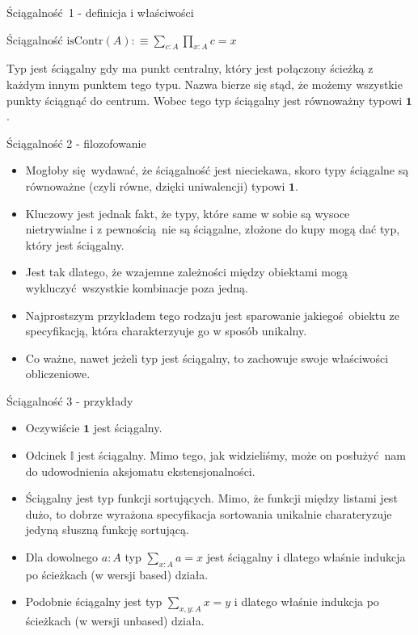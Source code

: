\documentclass{beamer}
\newcommand{\defn}{:\equiv}
\newcommand{\isContr}{\text{isContr}}
\newcommand{\I}{\mathbb{I}}
\begin{document}
\begin{frame}{Ściągalność 1 - definicja i właściwości}

\begin{block}{Ściągalność}
$
\displaystyle
\isContr(A) \defn \sum_{c : A} \prod_{x : A} c = x
$
\end{block}

Typ jest ściągalny gdy ma punkt centralny, który jest połączony ścieżką z każdym innym punktem tego typu. Nazwa bierze się stąd, że możemy wszystkie punkty ściągnąć do centrum. Wobec tego typ ściągalny jest równoważny typowi $\textbf{1}$.

\end{frame}

\begin{frame}{Ściągalność 2 - filozofowanie}
\begin{itemize}
	\item Mogłoby się wydawać, że ściągalność jest nieciekawa, skoro typy ściągalne są równoważne (czyli równe, dzięki uniwalencji) typowi $\textbf{1}$.
	\item Kluczowy jest jednak fakt, że typy, które same w sobie są wysoce nietrywialne i z pewnością nie są ściągalne, złożone do kupy mogą dać typ, który jest ściągalny.
	\item Jest tak dlatego, że wzajemne zależności między obiektami mogą wykluczyć wszystkie kombinacje poza jedną.
	\item Najprostszym przykładem tego rodzaju jest sparowanie jakiegoś obiektu ze specyfikacją, która charakterzyuje go w sposób unikalny.
	\item Co ważne, nawet jeżeli typ jest ściągalny, to zachowuje swoje właściwości obliczeniowe.
\end{itemize}
\end{frame}

\begin{frame}{Ściągalność 3 - przykłady}
\begin{itemize}
	\item Oczywiście $\textbf{1}$ jest ściągalny.
	\item Odcinek $\I$ jest ściągalny. Mimo tego, jak widzieliśmy, może on posłużyć nam do udowodnienia aksjomatu ekstensjonalności.
	\item Ściągalny jest typ funkcji sortujących. Mimo, że funkcji między listami jest dużo, to dobrze wyrażona specyfikacja sortowania unikalnie charateryzuje jedyną słuszną funkcję sortującą.
	\item Dla dowolnego $a : A$ typ $\sum_{x : A} a = x$ jest ściągalny i dlatego właśnie indukcja po ścieżkach (w wersji based) działa.
	\item Podobnie ściągalny jest typ $\sum_{x,y : A} x = y$ i dlatego właśnie indukcja po ścieżkach (w wersji unbased) działa.
\end{itemize}
\end{frame}
\end{document}
